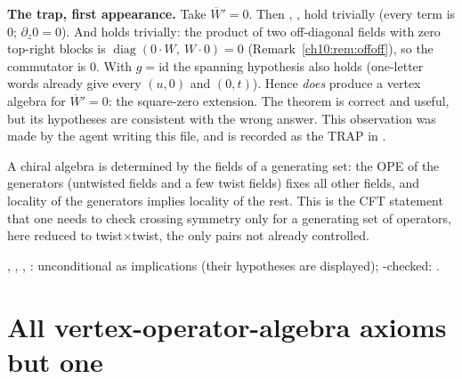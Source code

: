 \begin{warning}
\textbf{The trap, first appearance.}
Take $\overline W'=0$.  Then , ,  hold trivially (every term
is $0$; $\partial_z0=0$).  And  holds trivially: the product of two off-diagonal fields
with zero top-right blocks is $\operatorname{diag}(0\cdot W,\ W\cdot0)=0$
(Remark~\ref{ch10:rem:offoff}), so the commutator is $0$.  With $g=\mathrm{id}$ the spanning
hypothesis also holds (one-letter words already give every $(u,0)$ and $(0,t)$).  Hence
 \emph{does} produce a vertex algebra for $\overline W'=0$: the
square-zero extension.  The theorem is correct and useful, but its hypotheses are consistent
with the wrong answer.  This observation was made by the agent writing this file, and is recorded
as the TRAP in .
\end{warning}

\begin{physics}
A chiral algebra is determined by the fields of a generating set: the OPE of the generators (untwisted fields and a few twist fields) fixes all other fields, and locality of the generators implies locality of the rest. This is the CFT statement that one needs to check crossing symmetry only for a generating set of operators, here reduced to twist$\times$twist, the only pairs not already controlled.
\end{physics}

\begin{status}
, , , :
unconditional as implications (their hypotheses are displayed); 
-checked: .
\end{status}

\section{All vertex-operator-algebra axioms but one}\label{ch10:sec:axioms}

